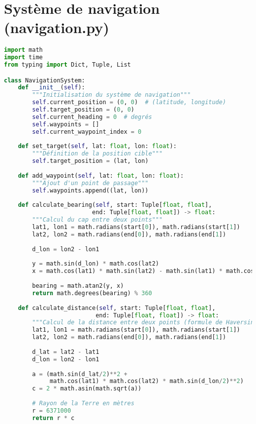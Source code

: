 \section{Système de navigation (navigation.py)}
\begin{lstlisting}[language=Python, caption=Système de navigation, label=lst:navigation-system]
import math
import time
from typing import Dict, Tuple, List

class NavigationSystem:
    def __init__(self):
        """Initialisation du système de navigation"""
        self.current_position = (0, 0)  # (latitude, longitude)
        self.target_position = (0, 0)
        self.current_heading = 0  # degrés
        self.waypoints = []
        self.current_waypoint_index = 0
        
    def set_target(self, lat: float, lon: float):
        """Définition de la position cible"""
        self.target_position = (lat, lon)
    
    def add_waypoint(self, lat: float, lon: float):
        """Ajout d'un point de passage"""
        self.waypoints.append((lat, lon))
    
    def calculate_bearing(self, start: Tuple[float, float], 
                         end: Tuple[float, float]) -> float:
        """Calcul du cap entre deux points"""
        lat1, lon1 = math.radians(start[0]), math.radians(start[1])
        lat2, lon2 = math.radians(end[0]), math.radians(end[1])
        
        d_lon = lon2 - lon1
        
        y = math.sin(d_lon) * math.cos(lat2)
        x = math.cos(lat1) * math.sin(lat2) - math.sin(lat1) * math.cos(lat2) * math.cos(d_lon)
        
        bearing = math.atan2(y, x)
        return math.degrees(bearing) % 360
    
    def calculate_distance(self, start: Tuple[float, float], 
                          end: Tuple[float, float]) -> float:
        """Calcul de la distance entre deux points (formule de Haversine)"""
        lat1, lon1 = math.radians(start[0]), math.radians(start[1])
        lat2, lon2 = math.radians(end[0]), math.radians(end[1])
        
        d_lat = lat2 - lat1
        d_lon = lon2 - lon1
        
        a = (math.sin(d_lat/2)**2 + 
             math.cos(lat1) * math.cos(lat2) * math.sin(d_lon/2)**2)
        c = 2 * math.asin(math.sqrt(a))
        
        # Rayon de la Terre en mètres
        r = 6371000
        return r * c
    

\end{lstlisting}
